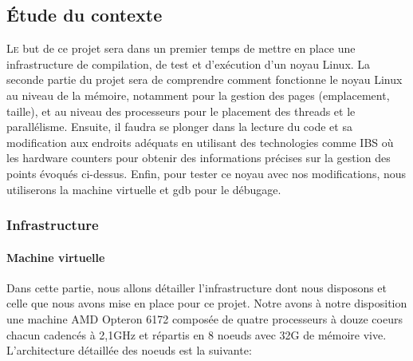 \subsection{Étude du contexte}

  \lettrine[nindent=0em,lines=3]{L}e but de ce projet sera dans un premier temps
  de mettre en place une infrastructure de compilation, de test et d'exécution
  d'un noyau Linux. La seconde partie du projet sera de comprendre comment
  fonctionne le noyau Linux au niveau de la mémoire, notamment pour la gestion
  des pages (emplacement, taille), et au niveau des processeurs pour le
  placement des threads et le parallélisme. Ensuite, il faudra se plonger dans
  la lecture du code et sa modification aux endroits adéquats en utilisant des
  technologies comme IBS où les hardware counters pour obtenir des informations
  précises sur la gestion des points évoqués ci-dessus. Enfin, pour tester ce
  noyau avec nos modifications, nous utiliserons la machine virtuelle et gdb
  pour le débugage.

  \subsubsection{Infrastructure}
    \paragraph{Machine virtuelle}
        Dans cette partie, nous allons détailler l'infrastructure dont nous
        disposons et celle que nous avons mise en place pour ce projet. Notre avons
        à notre disposition une machine AMD Opteron 6172 composée de quatre
        processeurs à douze coeurs chacun cadencés à 2,1GHz et répartis en 8 noeuds
        avec 32G de mémoire vive. L'architecture détaillée des noeuds est la
        suivante:


